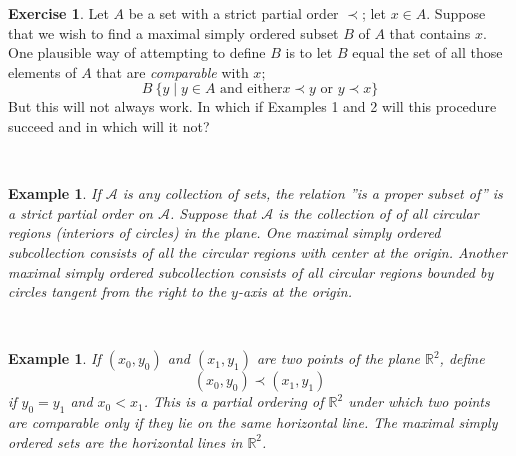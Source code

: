 \documentclass[11pt,a4paper,twoside]{article}
\theoremstyle{definition}
\newcounter{excounter}
\newtheorem{exercise}[excounter]{Exercise}
\newcounter{examplecounter}
\theoremstyle{plain}
\newtheorem{example}[examplecounter]{Example}
\begin{document}
\begin{exercise}

  Let $A$ be a set with a strict partial order $\prec$; let $x \in A$. Suppose that we wish to find
  a maximal simply ordered subset $B$ of $A$ that contains $x$. One plausible way of attempting to
  define $B$ is to let $B$ equal the set of all those elements of $A$ that are \emph{comparable} with $x$;
  \begin{equation*}
    B ~ \{ y \mid y \in A \text{ and either} x \prec y \text{ or } y \prec x \}
  \end{equation*}
  But this will not always work. In which if Examples 1 and 2 will this procedure succeed and in which
  will it not?

\end{exercise}

~\\
\begin{example}
  If $\mathscr{A}$ is any collection of sets, the relation ''is a proper subset of'' is a strict partial order on $\mathscr{A}$.
  Suppose that $\mathscr{A}$ is the collection of of all circular regions (interiors of circles) in the plane. One maximal
  simply ordered subcollection consists of all the circular regions with center at the origin. Another maximal simply ordered
  subcollection consists of all circular regions bounded by circles tangent from the right to the $y$-axis at the origin.
\end{example}

~\\
\begin{example}
  If $( x_0, y_0 )$ and $( x_1, y_1 )$ are two points of the plane $\mathbb{R}^2$, define
  \begin{equation*}
    ( x_0, y_0 ) \prec ( x_1, y_1 )
  \end{equation*}
  if $y_0 = y_1$ and $x_0 < x_1$. This is a partial ordering of $\mathbb{R}^2$ under which two points are comparable only if
  they lie on the same horizontal line. The maximal simply ordered sets are the horizontal lines in $\mathbb{R}^2$.
\end{example}
\end{document}
